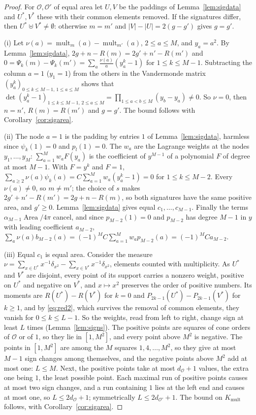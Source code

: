 \documentclass[pdflatex,sn-mathphys-num]{sn-jnl}
\theoremstyle{thmstyleone}%
\theoremstyle{thmstylethree}%
\newcommand{\Orb}{\mathcal{O}}
\newcommand{\Kmult}{K_{\mathrm{mult}}}
\newcommand{\Area}{\operatorname{Area}}
\newcommand{\mult}{\operatorname{mult}}
\begin{document}
\begin{proof}
For $\Orb,\Orb'$ of equal area let $U,V$ be the paddings of Lemma~\ref{lem:sigdata} and $U^*,V^*$ these with their common elements removed. If the signatures differ, then $U^*\uplus V^*\ne\emptyset$: otherwise $m=m'$ and $|V|-|U|=2(g-g')$ gives $g=g'$.

(i) Let $\nu(a)=\mult_m(a)-\mult_{m'}(a)$, $2\le a\le M$, and $y_a=a^2$. By Lemma~\ref{lem:sigdata}, $2g+n-R(m)=2g'+n'-R(m')$ and $0=\Psi_k(m)-\Psi_k(m')=\sum_a\frac{\nu(a)}a(y_a^k-1)$ for $1\le k\le M-1$. Subtracting the column $a=1$ ($y_1=1$) from the others in the Vandermonde matrix $(y_a^k)_{0\le k\le M-1,\,1\le a\le M}$ shows that $\det(y_a^k-1)_{1\le k\le M-1,\,2\le a\le M}=\prod_{1\le a<b\le M}(y_b-y_a)\ne0$. So $\nu=0$, then $n=n'$, $R(m)=R(m')$ and $g=g'$. The bound follows with Corollary~\ref{cor:sigarea}.

(ii) The node $a=1$ is the padding by entries $1$ of Lemma~\ref{lem:sigdata}, harmless since $\psi_k(1)=0$ and $p_l(1)=0$. The $w_a$ are the Lagrange weights at the nodes $y_1,\dots,y_M$: $\sum_{a=1}^Mw_aF(y_a)$ is the coefficient of $y^{M-1}$ of a polynomial $F$ of degree at most $M-1$. With $F=y^k$ and $F=1$, $\sum_{a\ge2}\nu(a)\psi_k(a)=C\sum_{a=1}^Mw_a(y_a^k-1)=0$ for $1\le k\le M-2$. Every $\nu(a)\ne0$, so $m\ne m'$; the choice of $s$ makes $2g'+n'-R(m')=2g+n-R(m)$, so both signatures have the same positive area, and $g'\ge0$. Lemma~\ref{lem:sigdata} gives equal $c_1,\dots,c_{M-1}$. Finally the terms $\alpha_{M-1}\Area/4\pi$ cancel, and since $p_{M-2}(1)=0$ and $p_{M-2}$ has degree $M-1$ in $y$ with leading coefficient $a_{M-2}$, $\sum_a\nu(a)b_{M-2}(a)=(-1)^MC\sum_{a=1}^Mw_ap_{M-2}(a)=(-1)^MCa_{M-2}$.

(iii) Equal $c_1$ is equal area. Consider the measure $\nu=\sum_{x\in U^*}x^{-1}\delta_{x^2}-\sum_{x\in V^*}x^{-1}\delta_{x^2}$, elements counted with multiplicity. As $U^*$ and $V^*$ are disjoint, every point of its support carries a nonzero weight, positive on $U^*$ and negative on $V^*$, and $x\mapsto x^2$ preserves the order of positive numbers. Its moments are $R(U^*)-R(V^*)$ for $k=0$ and $P_{2k-1}(U^*)-P_{2k-1}(V^*)$ for $k\ge1$, and by \eqref{eq:red2}, which survives the removal of common elements, they vanish for $0\le k\le L-1$. So the weights, read from left to right, change sign at least $L$ times (Lemma~\ref{lem:signs}). The positive points are squares of cone orders of $\Orb$ or of $1$, so they lie in $[1,M^2]$, and every point above $M^2$ is negative. The points in $[1,M^2]$ are among the $M$ squares $1,4,\dots,M^2$, so they give at most $M-1$ sign changes among themselves, and the negative points above $M^2$ add at most one: $L\le M$. Next, the positive points take at most $d_\Orb+1$ values, the extra one being $1$, the least possible point. Each maximal run of positive points causes at most two sign changes, and a run containing $1$ lies at the left end and causes at most one, so $L\le2d_\Orb+1$; symmetrically $L\le2d_{\Orb'}+1$. The bound on $\Kmult$ follows, with Corollary~\ref{cor:sigarea}.


\end{proof}
\end{document}
